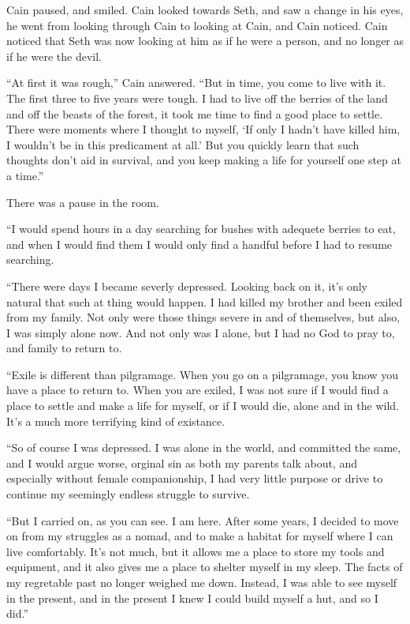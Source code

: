 \documentclass[12pt,twoside,titlepage]{report}
\begin{document}
Cain paused, and smiled. Cain looked towards Seth, and saw a change in
his eyes, he went from looking through Cain to looking at Cain, and Cain
noticed. Cain noticed that Seth was now looking at him as if he were a
person, and no longer as if he were the devil.

``At first it was rough,'' Cain answered. ``But in time, you come to
live with it. The first three to five years were tough. I had to live
off the berries of the land and off the beasts of the forest, it took me
time to find a good place to settle. There were moments where I thought
to myself, `If only I hadn't have killed him, I wouldn't be in this
predicament at all.' But you quickly learn that such thoughts don't aid
in survival, and you keep making a life for yourself one step at a
time.''

There was a pause in the room.

``I would spend hours in a day searching for bushes with adequete
berries to eat, and when I would find them I would only find a handful
before I had to resume searching.

``There were days I became severly depressed. Looking back on it, it's
only natural that such at thing would happen. I had killed my brother
and been exiled from my family. Not only were those things severe in and
of themselves, but also, I was simply alone now. And not only was I
alone, but I had no God to pray to, and family to return to.

``Exile is different than pilgramage. When you go on a pilgramage, you
know you have a place to return to. When you are exiled, I was not sure
if I would find a place to settle and make a life for myself, or if I
would die, alone and in the wild. It's a much more terrifying kind of
existance.

``So of course I was depressed. I was alone in the world, and committed
the same, and I would argue worse, orginal sin as both my parents talk
about, and especially without female companionship, I had very little
purpose or drive to continue my seemingly endless struggle to survive.

``But I carried on, as you can see. I am here. After some years, I
decided to move on from my struggles as a nomad, and to make a habitat
for myself where I can live comfortably. It's not much, but it allows me
a place to store my tools and equipment, and it also gives me a place to
shelter myself in my sleep. The facts of my regretable past no longer
weighed me down. Instead, I was able to see myself in the present, and
in the present I knew I could build myself a hut, and so I did.''
\end{document}
